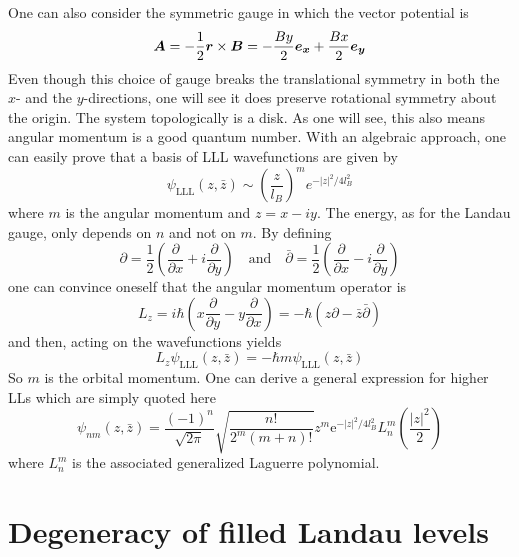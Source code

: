 		One can also consider the symmetric gauge in which the vector potential is
		\begin{equation}
		    \vb*{A}=-\frac12\vb*{r}\times\vb*{B}=-\frac{By}{2}\vb*{e_x}+\frac{Bx}{2}\vb*{e_y}
		\end{equation}
		Even though this choice of gauge breaks the translational symmetry in both the $x$- and the $y$-directions, one will see it does preserve rotational symmetry about the origin. The system topologically is a disk. As one will see, this also means angular momentum is a good quantum number. With an algebraic approach, one can easily prove that a basis of LLL wavefunctions are given by
		\begin{equation}
		    \psi_\text{LLL}(z, \bar{z})\sim\left(\frac{z}{l_B}\right)^m e^{-|z|^2/4l_B^2}
		\end{equation}
		where $m$ is the angular momentum and $z = x-iy$. The energy, as for the Landau gauge, only depends on $n$ and not on $m$. By defining 
		\begin{equation}
		    \partial=\frac12\left(\frac{\partial}{\partial x}+ i\frac{\partial}{\partial y}\right)\quad\text{and}\quad\bar{\partial}=\frac12\left(\frac{\partial}{\partial x}- i\frac{\partial}{\partial y}\right)
		\end{equation}
		one can convince oneself that the angular momentum operator is
		\begin{equation}
		    L_z = i\hbar\left(x\frac{\partial}{\partial y}-y\frac{\partial}{\partial x}\right)=-\hbar\left(z\partial-\bar{z}\bar{\partial}\right)
		\end{equation}
		and then, acting on the wavefunctions yields
		\begin{equation}
		    L_z\psi_\text{LLL}(z,\bar{z})=-\hbar m\psi_\text{LLL}(z, \bar{z})
		\end{equation}
		So $m$ is the orbital momentum. One can derive a general expression for higher LLs which are simply quoted here
		\begin{equation}
		    \psi_{nm}(z,\bar{z})=\frac{\left(-1\right)^n}{\sqrt{2\pi}}\sqrt{\frac{n!}{2^m(m+n)!}}z^m\mathrm{e}^{-|z|^2/4l_B^2}L_n^m\left(\frac{|z|^2}{2}\right)
		\end{equation}
		where $L_n^m$ is the associated generalized Laguerre polynomial.

	\section{Degeneracy of filled Landau levels}
		
